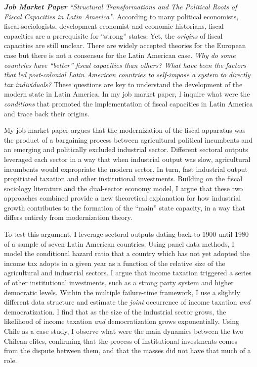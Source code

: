 \documentclass[11pt]{letter} %
\begin{document}
\begin{letter}{}
\emph{{\bf Job Market Paper} ``Structural Transformations and The Political Roots of Fiscal Capacities in Latin America''}.  According  to many political economists, fiscal sociologists, development economist and economic historians, fiscal capacities are a prerequisite for ``strong'' states. Yet, the \emph{origins} of fiscal capacities are still unclear. There are widely accepted theories for the European case but there is not a consensus for the Latin American case. \emph{Why do some countries have ``better'' fiscal capacities than others? What have been the factors that led post-colonial Latin American countries to self-impose a system to directly tax individuals?} These questions are key to understand the development of the modern state in Latin America. In my job market paper, I inquire what were the \emph{conditions} that promoted the implementation of fiscal capacities in Latin America and trace back their origins.


My job market paper argues that the modernization of the fiscal apparatus was the product of a bargaining process between agricultural political incumbents and an emerging and politically excluded industrial sector. Different sectoral outputs leveraged each sector in a way that when industrial output was slow, agricultural incumbents would expropriate the modern sector. In turn, fast industrial output propitiated taxation and other institutional investments. Building on the fiscal sociology literature and the dual-sector economy model, I argue that these two approaches combined provide a new theoretical explanation for how industrial growth contributes to the formation of the ``main'' state capacity, in a way that differs entirely from modernization theory. 

To test this argument, I leverage sectoral outputs dating back to 1900 until 1980 of a sample of seven Latin American countries. Using panel data methods, I model the conditional hazard ratio that a country which has not yet adopted the income tax adopts in a given year as a function of the relative size of the agricultural and industrial sectors. I argue that income taxation triggered a series of other institutional investments, such as a strong party system and higher democratic levels. Within the multiple failure-time framework, I use a slightly different data structure and estimate the \emph{joint} occurrence of income taxation \emph{and} democratization. I find that as the size of the industrial sector grows, the likelihood of income taxation \emph{and} democratization grows exponentially. Using Chile as a case study, I observe what were the main dynamics between the two Chilean elites, confirming that the process of institutional investments comes from the dispute between them, and that the masses did not have that much of a role. 


\end{letter}
\end{document}
